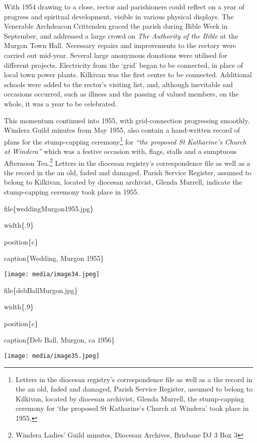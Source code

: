 With 1954 drawing to a close, rector and parishioners could reflect on a year of progress and spiritual development, visible in various physical displays. The Venerable Archdeacon Crittenden graced the parish during Bible Week in September, and addressed a large crowd on \emph{The Authority of the Bible} at the Murgon Town Hall\emph{.} Necessary repairs and improvements to the rectory were carried out mid-year. Several large anonymous donations were utilised for different projects. Electricity from the `grid' began to be connected, in place of local town power plants. Kilkivan was the first centre to be connected. Additional schools were added to the rector's visiting list, and, although inevitable sad occasions occurred, such as illness and the passing of valued members, on the whole, it was a year to be celebrated.

This momentum continued into 1955, with grid-connection progressing smoothly. Windera Guild minutes from May 1955, also contain a hand-written record of plans for the stump-capping ceremony\footnote{Letters in the diocesan registry's correspondence file as well as a the record in the an old, faded and damaged, Parish Service Register, assumed to belong to Kilkivan, located by diocesan archivist, Glenda Murrell, the stump-capping ceremony for `the proposed St Katharine's Church at Windera' took place in 1955.} for \emph{``the proposed St Katharine's Church at Windera''} which was a festive occasion with, flags, stalls and a sumptuous Afternoon Tea.\footnote{Windera Ladies' Guild minutes, Diocesan Archives, Brisbane DJ 3 Box 3} Letters in the diocesan registry's correspondence file as well as a the record in the an old, faded and damaged, Parish Service Register, assumed to belong to Kilkivan, located by diocesan archivist, Glenda Murrell, indicate the stump-capping ceremony took place in 1955.

file\{weddingMurgon1955.jpg\}

width\{.9\}

position\{c\}

caption\{Wedding, Murgon 1955\}

\texttt{[image: media/image34.jpeg]}

file\{debBallMurgon.jpg\}

width\{.9\}

position\{c\}

caption\{Deb Ball, Murgon, ca 1956\}

\texttt{[image: media/image35.jpeg]}

